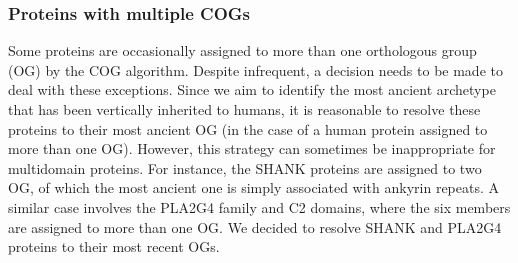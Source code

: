 \begin{Shaded}
\end{Shaded}

\hypertarget{proteins-with-multiple-cogs}{%
\subsubsection{Proteins with multiple
COGs}\label{proteins-with-multiple-cogs}}

Some proteins are occasionally assigned to more than one orthologous
group (OG) by the COG algorithm. Despite infrequent, a decision needs to
be made to deal with these exceptions. Since we aim to identify the most
ancient archetype that has been vertically inherited to humans, it is
reasonable to resolve these proteins to their most ancient OG (in the
case of a human protein assigned to more than one OG). However, this
strategy can sometimes be inappropriate for multidomain proteins. For
instance, the SHANK proteins are assigned to two OG, of which the most
ancient one is simply associated with ankyrin repeats. A similar case
involves the PLA2G4 family and C2 domains, where the six members are
assigned to more than one OG. We decided to resolve SHANK and PLA2G4
proteins to their most recent OGs.

